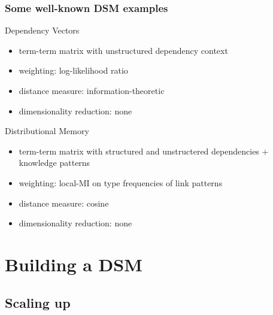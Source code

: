\documentclass[t]{beamer} %
\begin{document}
\begin{frame}
  \frametitle{Some well-known DSM examples}

  \ungap
  \begin{block}{Dependency Vectors \citep{Pado:Lapata:07}}
  \begin{itemize}
  \item term-term matrix with unstructured dependency context
  \item weighting: log-likelihood ratio
  \item distance measure: information-theoretic \citep{Lin:98a}
  \item dimensionality reduction: none
  \end{itemize}
  \end{block}
 
 \begin{block} {Distributional Memory \citep{Baroni:Lenci:10}}
  \begin{itemize}
  \item term-term matrix with structured and unstructered dependencies + knowledge patterns
  \item weighting: local-MI on type frequencies of link patterns
  \item distance measure: cosine
  \item dimensionality reduction: none
  \end{itemize}
  \end{block}
 \end{frame}

\section{Building a DSM}

\subsection{Scaling up}
\end{document}
